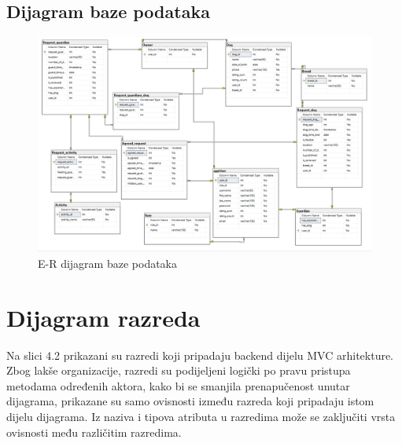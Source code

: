 			
			
		\eject
			\subsection{Dijagram baze podataka}
			
			\begin{figure}[htb]
				\centering
				\includegraphics[width=16cm]{slike/dijagramASCP}
				\caption{E-R dijagram baze podataka} 
				\label{fig:E-Rdijagram}
			\end{figure}
			
			\eject
			
			
		\section{Dijagram razreda}
		
			Na slici 4.2 prikazani su razredi koji pripadaju backend dijelu MVC arhitekture.  Zbog lakše organizacije, razredi su podijeljeni logički po pravu pristupa metodama određenih aktora, kako bi se smanjila prenapučenost unutar dijagrama, prikazane su samo ovisnosti između razreda koji pripadaju istom dijelu dijagrama. Iz naziva i tipova atributa u razredima može se zaključiti vrsta ovisnosti među različitim razredima.
			
